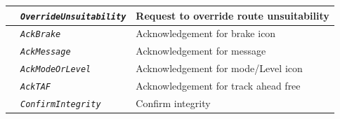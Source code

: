 \documentclass{template/openetcs}
\begin{document}
\begin{itemize}
\begin{longtable}{|l|l|l|}
			\hline
			
			&	\begin{minipage}[t]{0.40\linewidth} \emph{\texttt{OverrideUnsuitability}} \end{minipage}
			&	\begin{minipage}[t]{0.38\linewidth} Request to override route unsuitability \end{minipage} \\
			
			\hline
			
			&	\begin{minipage}[t]{0.40\linewidth} \emph{\texttt{AckBrake}} \end{minipage}
			&	\begin{minipage}[t]{0.38\linewidth} Acknowledgement for brake icon \end{minipage} \\
			
			\hline
			
			&	\begin{minipage}[t]{0.40\linewidth} \emph{\texttt{AckMessage}} \end{minipage}
			&	\begin{minipage}[t]{0.38\linewidth} Acknowledgement for message \end{minipage} \\
			
			\hline
			
			&	\begin{minipage}[t]{0.40\linewidth} \emph{\texttt{AckModeOrLevel}} \end{minipage}
			&	\begin{minipage}[t]{0.38\linewidth} Acknowledgement for mode/Level icon \end{minipage} \\
			
			\hline
			
			&	\begin{minipage}[t]{0.40\linewidth} \emph{\texttt{AckTAF}} \end{minipage}
			&	\begin{minipage}[t]{0.38\linewidth} Acknowledgement for track ahead free \end{minipage} \\
			
			\hline
			
			&	\begin{minipage}[t]{0.40\linewidth} \emph{\texttt{ConfirmIntegrity}} \end{minipage}
			&	\begin{minipage}[t]{0.38\linewidth} Confirm integrity \end{minipage} \\
			

\end{longtable}
\end{itemize}
\end{document}
